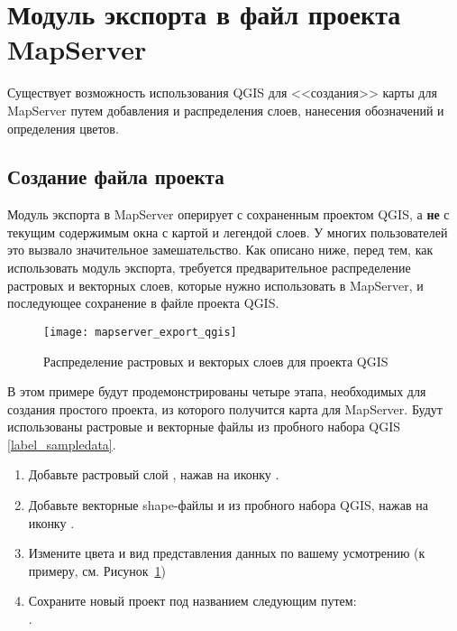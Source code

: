 
\section{Модуль экспорта в файл проекта MapServer}\label{sec:mapserver_export}


Существует возможность использования QGIS для <<создания>> карты для MapServer
путем добавления и распределения слоев, нанесения обозначений и определения цветов.

\subsection{Создание файла проекта}

Модуль экспорта в MapServer оперирует с сохраненным проектом QGIS, а
\textbf{не} с текущим содержимым окна с картой и легендой слоев. У
многих пользователей это вызвало значительное замешательство. Как
описано ниже, перед тем, как использовать модуль экспорта, требуется
предварительное распределение растровых и векторных слоев, которые нужно
использовать в MapServer, и последующее сохранение в файле проекта QGIS.

\begin{figure}[ht]
\centering
  \texttt{[image: mapserver\_export\_qgis]}
   \caption{Распределение растровых и векторых слоев для проекта QGIS \wincaption}
  \label{fig:mapserver_export_qgs}
\end{figure}

В этом примере будут продемонстрированы четыре этапа, необходимых для
создания простого проекта, из которого получится карта
для MapServer. Будут использованы растровые и векторные файлы из
пробного набора QGIS \ref{label_sampledata}.

\begin{enumerate}
\item Добавьте растровый слой , нажав на иконку
.
\item Добавьте векторные shape-файлы 
и  из пробного набора QGIS, нажав на иконку
.
\item Измените цвета и вид представления данных по вашему усмотрению
(к примеру, см. Рисунок~\ref{fig:mapserver_export_qgs})
\item Сохраните новый проект под названием 
следующим путем: \\
 \arrow {}.
\end{enumerate}

